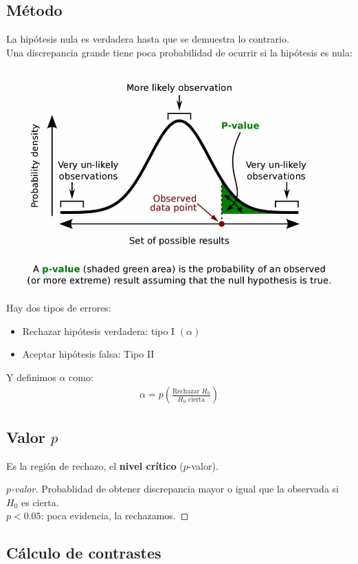 \documentclass{article}
\begin{document}
\subsection{Método}
La hipótesis nula es verdadera hasta que se demuestra lo contrario.\\
Una discrepancia grande tiene poca probabilidad de ocurrir si la hipótesis es nula:
\begin{center}
    \includegraphics[scale=0.25]{p-value.jpg}
\end{center}
Hay dos tipos de errores:
\begin{itemize}
    \item Rechazar hipótesis verdadera: tipo I $(\alpha )$
    \item Aceptar hipótesis falsa: Tipo II
\end{itemize}
Y definimos $\alpha $ como:
\begin{equation}
    \begin{split}
        \alpha = p(\frac{\text{Rechazar }H_{0}}{H_{0}\text{ cierta}})
    \end{split}
\end{equation}
\subsection{Valor $p$}
Es la región de rechazo, el \textbf{nivel crítico} ($p$-valor).
\begin{proof}[$p$-valor]
    Probablidad de obtener discrepancia mayor o igual que la observada si $H_{0}$ es cierta.\\
    $p<0.05$: poca evidencia, la rechazamos.
\end{proof}
\subsection{Cálculo de contrastes}
\end{document}
